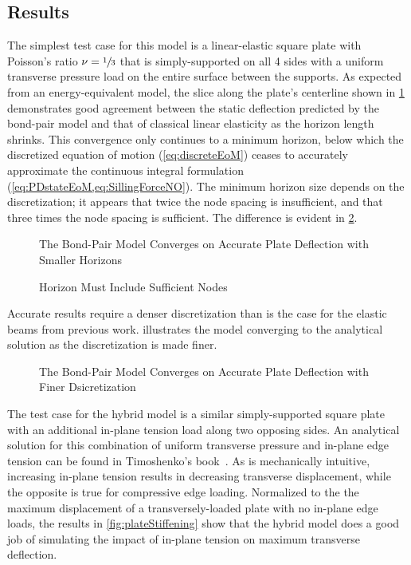 \documentclass[preprint,review,12pt]{elsarticle}
\newcommand{\plotpath}{./plots}
\begin{document}
\subsection{Results}
The simplest test case for this model is a linear-elastic square plate with Poisson's ratio \(\nu = \sfrac{1}{3}\) that is simply-supported on all 4 sides with a uniform transverse pressure load on the entire surface between the supports.
As expected from an energy-equivalent model, the slice along the plate's centerline shown in \cref{fig:plate_convergence_h} demonstrates good agreement between the static deflection predicted by the bond-pair model and that of classical linear elasticity as the horizon length shrinks.
This convergence only continues to a minimum horizon, below which the discretized equation of motion (\cref{eq:discreteEoM}) ceases to accurately approximate the continuous integral formulation (\cref{eq:PDstateEoM,eq:SillingForceNO}).
The minimum horizon size depends on the discretization; it appears that twice the node spacing is insufficient, and that three times the node spacing is sufficient.
The difference is evident in \cref{fig:plate_minimum_h}.

%
\begin{figure}[h]
  \centering
  \resizebox{0.55\linewidth}{!}{}
  \caption{The Bond-Pair Model Converges on Accurate Plate Deflection with Smaller Horizons}
  \label{fig:plate_convergence_h}
\end{figure}

%
\begin{figure}[h]
  \centering
  \resizebox{0.55\linewidth}{!}{}
  \caption{Horizon Must Include Sufficient Nodes}
  \label{fig:plate_minimum_h}
\end{figure}

Accurate results require a denser discretization than is the case for the elastic beams from previous work.
 illustrates the model converging to the analytical solution as the discretization is made finer.

%
\begin{figure}[h]
  \centering
  \resizebox{0.55\linewidth}{!}{}
  \caption{The Bond-Pair Model Converges on Accurate Plate Deflection with Finer Dsicretization}
  \label{fig:plate_convergence_n}
\end{figure}

The test case for the hybrid model is a similar simply-supported square plate with an additional in-plane tension load along two opposing sides.
An analytical solution for this combination of uniform transverse pressure and in-plane edge tension can be found in Timoshenko's book~\cite{timoshenko1959theory}.
As is mechanically intuitive, increasing in-plane tension results in decreasing transverse displacement, while the opposite is true for compressive edge loading.
Normalized to the the maximum displacement of a transversely-loaded plate with no in-plane edge loads, the results in \cref{fig:plateStiffening} show that the hybrid model does a good job of simulating the impact of in-plane tension on maximum transverse deflection.
\end{document}
